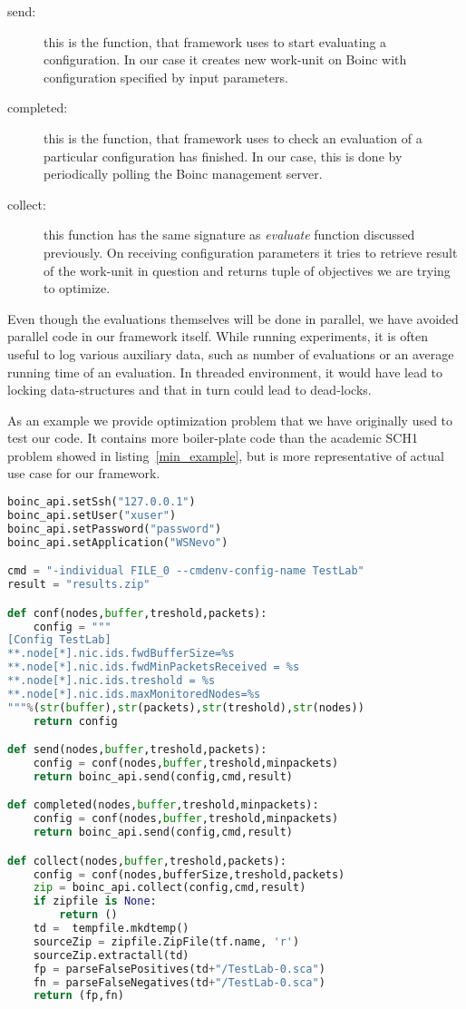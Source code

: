 \documentclass[12pt,oneside]{fithesis2}
\begin{document}
\begin{description}
\item[send:] this is the function, that framework uses to start evaluating a configuration. In our case it creates new work-unit on Boinc with configuration specified by input parameters.
\item[completed:] this is the function, that framework uses to check an evaluation of a particular configuration has finished. In our case, this is done by periodically polling the Boinc management server.
\item[collect:] this function has the same signature as \emph{evaluate} function discussed previously. On receiving configuration parameters it tries to retrieve result of the work-unit in question and returns tuple of objectives we are trying to optimize.
\end{description}

Even though the evaluations themselves will be done in parallel, we have avoided parallel code in our framework itself. While running experiments, it is often useful to log various auxiliary data, such as number of evaluations or an average running time of an evaluation. In threaded environment, it would have lead to locking data-structures and that in turn could lead to dead-locks.

As an example we provide optimization problem that we have originally used to test our code. It contains more boiler-plate code than the academic SCH1 problem showed in listing~\ref{min_example}, but is more representative of actual use case for our framework.

\begin{lstlisting}[language=Python,label=boinc_example,caption=Example usage of boinc]
boinc_api.setSsh("127.0.0.1")
boinc_api.setUser("xuser")
boinc_api.setPassword("password")
boinc_api.setApplication("WSNevo")

cmd = "-individual FILE_0 --cmdenv-config-name TestLab"
result = "results.zip"

def conf(nodes,buffer,treshold,packets):
    config = """
[Config TestLab]
**.node[*].nic.ids.fwdBufferSize=%s
**.node[*].nic.ids.fwdMinPacketsReceived = %s
**.node[*].nic.ids.treshold = %s
**.node[*].nic.ids.maxMonitoredNodes=%s
"""%(str(buffer),str(packets),str(treshold),str(nodes))
    return config

def send(nodes,buffer,treshold,packets):
    config = conf(nodes,buffer,treshold,minpackets)
    return boinc_api.send(config,cmd,result)

def completed(nodes,buffer,treshold,minpackets):
    config = conf(nodes,buffer,treshold,minpackets)
    return boinc_api.send(config,cmd,result)

def collect(nodes,buffer,treshold,packets):
    config = conf(nodes,bufferSize,treshold,packets)
    zip = boinc_api.collect(config,cmd,result)
    if zipfile is None:
        return ()
    td =  tempfile.mkdtemp()
    sourceZip = zipfile.ZipFile(tf.name, 'r')
    sourceZip.extractall(td)
    fp = parseFalsePositives(td+"/TestLab-0.sca")
    fn = parseFalseNegatives(td+"/TestLab-0.sca")
    return (fp,fn)
\end{lstlisting}
\end{document}

